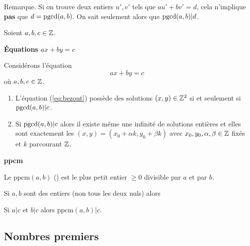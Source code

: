 \documentclass[10pt,class=article,crop=false]{standalone}
\begin{document}
\begin{multicols}{2}
Remarque. Si on trouve deux entiers $u',v'$ tels que $au'+bv'=d$, cela n'implique
	\textbf{pas} que $d=\mathop{\text{pgcd}}(a,b)$. On sait seulement alors que $\mathop{\text{pgcd}}(a,b)|d$.
	
\begin{corollaire}
	Soient $a,b,c \in \mathbb{Z}$.
\end{corollaire}


\textbf{\'Equations $ax+by=c$}

\begin{proposition}
	\label{prop:dioph}
	Considérons l'équation
	\begin{equation}
		\label{eq:bezout}
		\tag{E}
		ax+by=c
	\end{equation}
	où $a,b,c \in \mathbb{Z}$.
	\begin{enumerate}
		\item L'équation (\ref{eq:bezout}) possède des solutions $(x,y)\in \mathbb{Z}^2$ si et seulement si
		$\mathop{\text{pgcd}}(a,b) | c$.
		\item Si $\mathop{\text{pgcd}}(a,b) | c$ alors il existe même une infinité de solutions entières et elles sont exactement les
		$(x,y) = (x_0+ \alpha k, y_0 + \beta k)$ avec $x_0,y_0,\alpha,\beta \in \mathbb{Z}$ fixés et $k$ parcourant $\mathbb{Z}$.
	\end{enumerate}
\end{proposition}


\textbf{ppcm}


	Le $\text{ppcm}(a,b)$ ()
	est le plus petit entier $\ge 0$ divisible par $a$ et par $b$.


\begin{proposition}
	Si $a,b$ sont des entiers (non tous les deux nuls) alors
\end{proposition}

\begin{proposition}
	Si $a|c$ et $b|c$ alors $\text{ppcm}(a,b)|c$.
\end{proposition}



\subsection{Nombres premiers}


\end{multicols}
\end{document}
